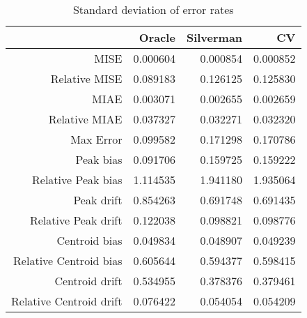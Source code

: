 \begin{table}[ht]
\centering
\begin{tabular}{rrrr}
  \hline
 & Oracle & Silverman & CV \\ 
  \hline
MISE & 0.000604 & 0.000854 & 0.000852 \\ 
  Relative MISE & 0.089183 & 0.126125 & 0.125830 \\ 
  MIAE & 0.003071 & 0.002655 & 0.002659 \\ 
  Relative MIAE & 0.037327 & 0.032271 & 0.032320 \\ 
  Max Error & 0.099582 & 0.171298 & 0.170786 \\ 
  Peak bias & 0.091706 & 0.159725 & 0.159222 \\ 
  Relative Peak bias & 1.114535 & 1.941180 & 1.935064 \\ 
  Peak drift & 0.854263 & 0.691748 & 0.691435 \\ 
  Relative Peak drift & 0.122038 & 0.098821 & 0.098776 \\ 
  Centroid bias & 0.049834 & 0.048907 & 0.049239 \\ 
  Relative Centroid bias & 0.605644 & 0.594377 & 0.598415 \\ 
  Centroid drift & 0.534955 & 0.378376 & 0.379461 \\ 
  Relative Centroid drift & 0.076422 & 0.054054 & 0.054209 \\ 
   \hline
\end{tabular}
\caption{Standard deviation of error rates} 
\label{tbl:stddev_error_rates}
\end{table}
